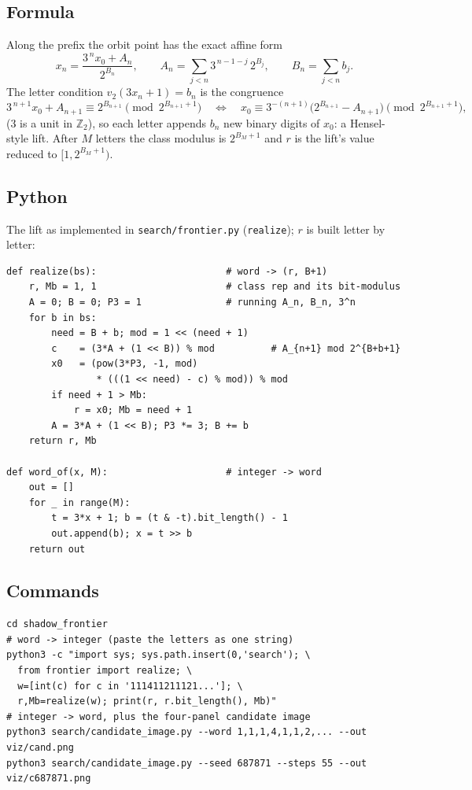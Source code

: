 \documentclass[10pt]{article}
\begin{document}
\subsection*{Formula}
Along the prefix the orbit point has the exact affine form
\[
x_n=\frac{3^{\,n}x_0+A_n}{2^{B_n}},\qquad
A_n=\sum_{j<n}3^{\,n-1-j}\,2^{B_j},\qquad B_n=\sum_{j<n}b_j .
\]
The letter condition $v_2(3x_n+1)=b_n$ is the congruence
\[
3^{\,n+1}x_0+A_{n+1}\equiv 2^{B_{n+1}}\pmod{2^{B_{n+1}+1}}
\quad\Longleftrightarrow\quad
x_0\equiv 3^{-(n+1)}\bigl(2^{B_{n+1}}-A_{n+1}\bigr)
\pmod{2^{B_{n+1}+1}},
\]
($3$ is a unit in $\mathbb Z_2$), so each letter appends $b_n$ new
binary digits of $x_0$: a Hensel-style lift. After $M$ letters the class
modulus is $2^{B_M+1}$ and $r$ is the lift's value reduced to
$[1,2^{B_M+1})$.

\subsection*{Python}
The lift as implemented in \texttt{search/frontier.py}
(\texttt{realize}); $r$ is built letter by letter:
\begin{verbatim}
def realize(bs):                       # word -> (r, B+1)
    r, Mb = 1, 1                       # class rep and its bit-modulus
    A = 0; B = 0; P3 = 1               # running A_n, B_n, 3^n
    for b in bs:
        need = B + b; mod = 1 << (need + 1)
        c    = (3*A + (1 << B)) % mod          # A_{n+1} mod 2^{B+b+1}
        x0   = (pow(3*P3, -1, mod)
                * (((1 << need) - c) % mod)) % mod
        if need + 1 > Mb:
            r = x0; Mb = need + 1
        A = 3*A + (1 << B); P3 *= 3; B += b
    return r, Mb

def word_of(x, M):                     # integer -> word
    out = []
    for _ in range(M):
        t = 3*x + 1; b = (t & -t).bit_length() - 1
        out.append(b); x = t >> b
    return out
\end{verbatim}

\subsection*{Commands}
\begin{verbatim}
cd shadow_frontier
# word -> integer (paste the letters as one string)
python3 -c "import sys; sys.path.insert(0,'search'); \
  from frontier import realize; \
  w=[int(c) for c in '111411211121...']; \
  r,Mb=realize(w); print(r, r.bit_length(), Mb)"
# integer -> word, plus the four-panel candidate image
python3 search/candidate_image.py --word 1,1,1,4,1,1,2,... --out viz/cand.png
python3 search/candidate_image.py --seed 687871 --steps 55 --out viz/c687871.png
\end{verbatim}
\end{document}
